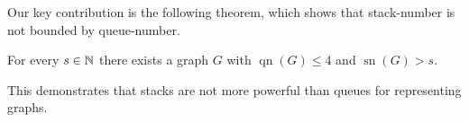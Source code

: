\documentclass[kpfonts]{patmorin}
\DeclareMathOperator{\sn}{sn}
\DeclareMathOperator{\qn}{qn}
\renewcommand{\le}{\leqslant}
\renewcommand{\leq}{\leqslant}
\begin{document}



Our key contribution is the following theorem, which shows that stack-number is not bounded by queue-number.

\begin{thm}\label{family}
	For every $s\in \mathbb{N}$ there exists a graph $G$ with $\qn(G)\le 4$ and $\sn(G)>s$.
\end{thm}

This demonstrates that stacks are not more powerful than queues for representing graphs.
\end{document}

